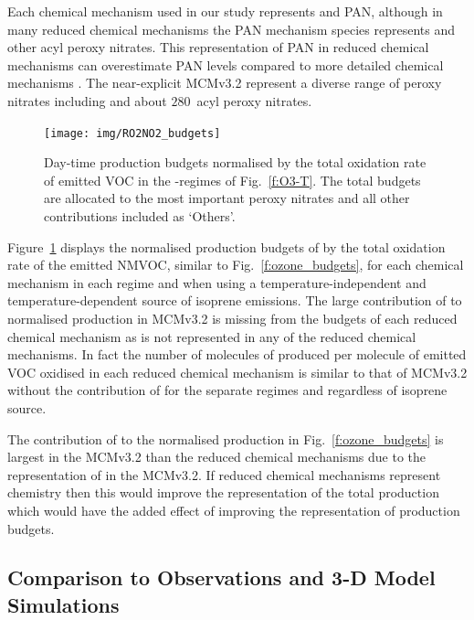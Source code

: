 Each chemical mechanism used in our study represents  and PAN, although in many reduced chemical mechanisms the PAN mechanism species represents  and other acyl peroxy nitrates.
This representation of PAN in reduced chemical mechanisms can overestimate PAN levels compared to more detailed chemical mechanisms \citep{Luecken:1999}.
The near-explicit MCMv3.2 represent a diverse range of peroxy nitrates including  and about $280$~acyl peroxy nitrates.

\begin{figure}[t]%
    \centering%
    \caption{Day-time  production budgets normalised by the total oxidation rate of emitted VOC in the -regimes of Fig.~\ref{f:O3-T}. The total budgets are allocated to the most important peroxy nitrates and all other contributions included as `Others'.}%
    \label{f:ro2no2_budgets}%
    \texttt{[image: img/RO2NO2\_budgets]}
\end{figure}

Figure~\ref{f:ro2no2_budgets} displays the normalised production budgets of  by the total oxidation rate of the emitted NMVOC, similar to Fig.~\ref{f:ozone_budgets}, for each chemical mechanism in each  regime and when using a temperature-independent and temperature-dependent source of isoprene emissions.
The large contribution of  to normalised  production in MCMv3.2 is missing from the budgets of each reduced chemical mechanism as  is not represented in any of the reduced chemical mechanisms.
In fact the number of molecules of  produced per molecule of emitted VOC oxidised in each reduced chemical mechanism is similar to that of MCMv3.2 without the contribution of  for the separate  regimes and regardless of isoprene source.

The contribution of  to the normalised  production in Fig.~\ref{f:ozone_budgets} is largest in the MCMv3.2 than the reduced chemical mechanisms due to the representation of  in the MCMv3.2.
If reduced chemical mechanisms represent  chemistry then this would improve the representation of the total  production which would have the added effect of improving the representation of  production budgets.

\subsection{Comparison to Observations and 3-D Model Simulations} \label{ss:r_observations}

